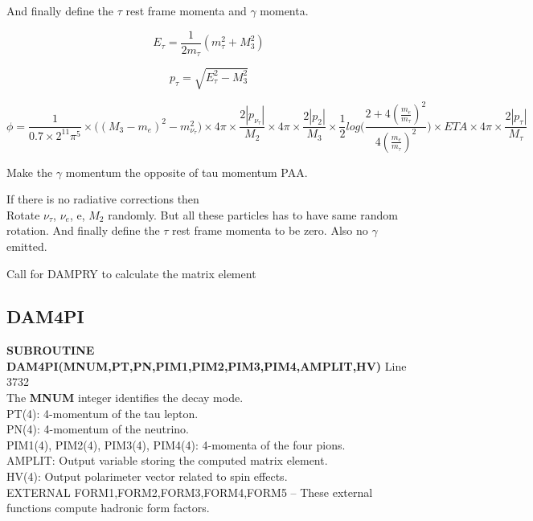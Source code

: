 \documentclass[12pt]{article}
\begin{document}
And finally define the $\tau$ rest frame momenta and $\gamma$ momenta.

\[E_\tau = \frac{1}{2m_\tau}(m_\tau^2 + M_3^2)\]

\[p_\tau = \sqrt{E_\tau^2 - M_3^2}\]

\[\phi  = \frac{1}{0.7 \times 2^{11} \pi^5} \times \Big((M_{3} - m_e)^2 - m_{\nu_\tau}^2\Big)\times 4\pi \times \frac{2|p_{\nu_\tau}|}{M_2} \times 4\pi \times \frac{2|p_2|}{M_3} \times \frac{1}{2} log\Bigg(  \frac{2+4  (\frac{m_e}{m_\tau})^2 }{4  (\frac{m_e}{m_\tau})^2}       \Bigg) \times ETA \times 4\pi \times \frac{2|p_\tau|}{M_\tau}\]


Make the $\gamma$ momentum the opposite of tau momentum PAA.

{\color{red} If there is no radiative corrections then }\\

Rotate $\nu_\tau$, $\nu_e$, e, $M_2$ randomly. But all these particles has to have same random rotation. And finally define the $\tau$ rest frame momenta to be zero. Also no $\gamma$ emitted.


Call for DAMPRY to calculate the matrix element


\subsection{DAM4PI}
\textbf{SUBROUTINE DAM4PI(MNUM,PT,PN,PIM1,PIM2,PIM3,PIM4,AMPLIT,HV)}     Line 3732\\

The \textbf{MNUM} integer identifies the decay mode. \\

PT(4): 4-momentum of the tau lepton.\\

PN(4): 4-momentum of the neutrino. \\

PIM1(4), PIM2(4), PIM3(4), PIM4(4): 4-momenta of the four pions. \\

AMPLIT: Output variable storing the computed matrix element.\\

HV(4): Output polarimeter vector related to spin effects.\\



EXTERNAL FORM1,FORM2,FORM3,FORM4,FORM5   -- These external functions compute hadronic form factors.\\
\end{document}

